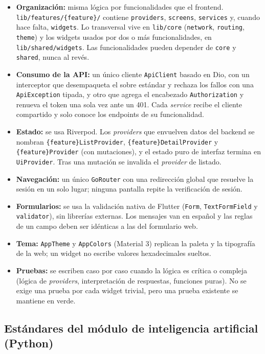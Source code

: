 \begin{itemize}
    \item \textbf{Organización:} misma lógica por funcionalidades que el frontend. \texttt{lib/features/\{feature\}/} contiene \texttt{providers}, \texttt{screens}, \texttt{services} y, cuando hace falta, \texttt{widgets}. Lo transversal vive en \texttt{lib/core} (\texttt{network}, \texttt{routing}, \texttt{theme}) y los widgets usados por dos o más funcionalidades, en \texttt{lib/shared/widgets}. Las funcionalidades pueden depender de \texttt{core} y \texttt{shared}, nunca al revés.
    \item \textbf{Consumo de la API:} un único cliente \texttt{ApiClient} basado en Dio, con un interceptor que desempaqueta el sobre estándar y rechaza los fallos con una \texttt{ApiException} tipada, y otro que agrega el encabezado \texttt{Authorization} y renueva el token una sola vez ante un 401. Cada \textit{service} recibe el cliente compartido y solo conoce los endpoints de su funcionalidad.
    \item \textbf{Estado:} se usa Riverpod. Los \textit{providers} que envuelven datos del backend se nombran \texttt{\{feature\}ListProvider}, \texttt{\{feature\}DetailProvider} y \texttt{\{feature\}Provider} (con mutaciones), y el estado puro de interfaz termina en \texttt{UiProvider}. Tras una mutación se invalida el \textit{provider} de listado.
    \item \textbf{Navegación:} un único \texttt{GoRouter} con una redirección global que resuelve la sesión en un solo lugar; ninguna pantalla repite la verificación de sesión.
    \item \textbf{Formularios:} se usa la validación nativa de Flutter (\texttt{Form}, \texttt{TextFormField} y \texttt{validator}), sin librerías externas. Los mensajes van en español y las reglas de un campo deben ser idénticas a las del formulario web.
    \item \textbf{Tema:} \texttt{AppTheme} y \texttt{AppColors} (Material 3) replican la paleta y la tipografía de la web; un widget no escribe valores hexadecimales sueltos.
    \item \textbf{Pruebas:} se escriben caso por caso cuando la lógica es crítica o compleja (lógica de \textit{providers}, interpretación de respuestas, funciones puras). No se exige una prueba por cada widget trivial, pero una prueba existente se mantiene en verde.
\end{itemize}

\subsection{Estándares del módulo de inteligencia artificial (Python)}

